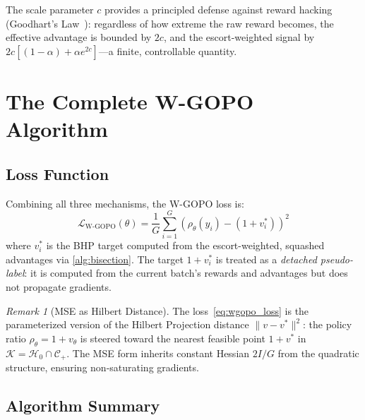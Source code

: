 \documentclass[11pt]{article}
\theoremstyle{definition}
\theoremstyle{remark}
\newtheorem{remark}[theorem]{Remark}
\newcommand{\loss}{\mathcal{L}}
\begin{document}
The scale parameter $c$ provides a principled defense against reward hacking (Goodhart's Law~\cite{Gao2023Scaling}): regardless of how extreme the raw reward becomes, the effective advantage is bounded by $2c$, and the escort-weighted signal by $2c[(1-\alpha) + \alpha e^{2c}]$---a finite, controllable quantity.

\section{The Complete W-GOPO Algorithm}
\label{sec:algorithm}

\subsection{Loss Function}

Combining all three mechanisms, the W-GOPO loss is:
\begin{equation}
\label{eq:wgopo_loss}
\boxed{
    \loss_{\text{W-GOPO}}(\theta) = \frac{1}{G}\sum_{i=1}^G \left( \rho_\theta(y_i) - (1 + v_i^*) \right)^2
}
\end{equation}
where $v_i^*$ is the BHP target computed from the escort-weighted, squashed advantages via \cref{alg:bisection}. The target $1 + v_i^*$ is treated as a \emph{detached pseudo-label}: it is computed from the current batch's rewards and advantages but does not propagate gradients.

\begin{remark}[MSE as Hilbert Distance]
The loss~\eqref{eq:wgopo_loss} is the parameterized version of the Hilbert Projection distance $\|v - v^*\|^2$: the policy ratio $\rho_\theta = 1 + v_\theta$ is steered toward the nearest feasible point $1 + v^*$ in $\mathcal{K} = \mathcal{H}_0 \cap \mathcal{C}_+$. The MSE form inherits constant Hessian $2I/G$ from the quadratic structure, ensuring non-saturating gradients.
\end{remark}

\subsection{Algorithm Summary}
\end{document}
